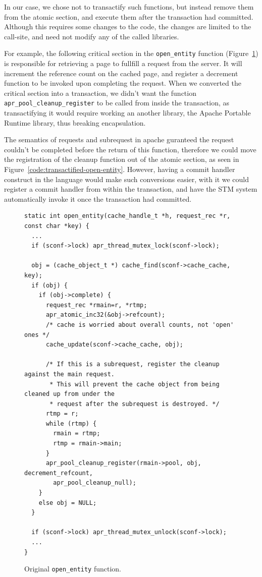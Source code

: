 \documentclass[preprint,natbib,11pt]{sigplanconf}
\begin{document}
In our case, we chose not to transactify such functions, but instead remove them
from the atomic section, and execute them after the transaction had committed.
Although this requires some changes to the code, the changes are limited to the
call-site, and need not modify any of the called libraries.

For example, the following critical section in the {\tt open\_entity} function
(Figure~\ref{code:original-open-entity}) is responsible for retrieving a page
to fullfill a request from the server. It will increment the reference count on
the cached page, and register a decrement function to be invoked upon completing
the request. When we converted the critical section into a transaction, we
didn't want the function {\tt apr\_pool\_cleanup\_register} to be called from
inside the transaction, as transactifying it would require working an another
library, the Apache Portable Runtime library, thus breaking encapsulation.

The semantics of requests and subrequest in apache guranteed the request
couldn't be completed before the return of this function, therefore we could
move the registration of the cleanup function out of the atomic section, as seen
in Figure~\ref{code:transactified-open-entity}. However, having a commit
handler construct in the language would make such conversions easier, with it we
could register a commit handler from within the transaction, and have the STM
system automatically invoke it once the transaction had committed.

\begin{figure}
\begin{lstlisting}
static int open_entity(cache_handle_t *h, request_rec *r, const char *key) {
  ...
  if (sconf->lock) apr_thread_mutex_lock(sconf->lock);

  obj = (cache_object_t *) cache_find(sconf->cache_cache, key);
  if (obj) {
    if (obj->complete) {
      request_rec *rmain=r, *rtmp;
      apr_atomic_inc32(&obj->refcount);
      /* cache is worried about overall counts, not 'open' ones */
      cache_update(sconf->cache_cache, obj);

      /* If this is a subrequest, register the cleanup against the main request.
       * This will prevent the cache object from being cleaned up from under the
       * request after the subrequest is destroyed. */
      rtmp = r;
      while (rtmp) {
        rmain = rtmp;
        rtmp = rmain->main;
      }
      apr_pool_cleanup_register(rmain->pool, obj, decrement_refcount, 
        apr_pool_cleanup_null);
    }
    else obj = NULL;
  }

  if (sconf->lock) apr_thread_mutex_unlock(sconf->lock);
  ...
}
\end{lstlisting}
\caption{Original {\tt open\_entity} function.}
\label{code:original-open-entity}
\end{figure}
\end{document}
